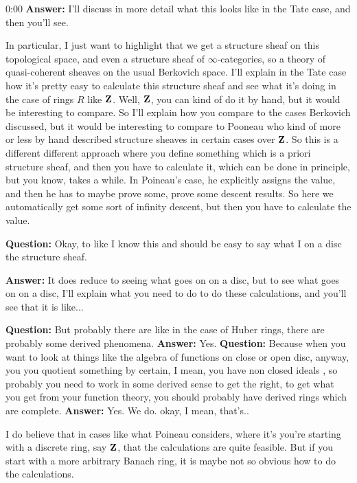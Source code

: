 \begin{unfinished}{0:00}
\textbf{Answer:} I'll discuss in more detail what this looks like in the Tate case, and then you'll see.

In particular, I just want to highlight that we get a structure sheaf on this topological space, and even a structure sheaf of $\infty$-categories, so a theory of quasi-coherent sheaves on the usual Berkovich space. 
I'll explain in the Tate case how it's pretty easy to calculate this structure sheaf and see what it's doing in the case of rings $R$ like $\mathbf Z$. Well, $\mathbf Z$, you can kind of do it by hand, but it would be interesting to compare. 
So I'll explain how you compare to the cases Berkovich discussed, but it would be interesting to compare to Pooneau \citeme{} who kind of more or less by hand described structure sheaves in certain cases over $\mathbf Z$. So this is a different different approach where you define something which is a priori structure sheaf, and then you have to calculate it, which can be done in principle, but you know, takes a while. In Poineau's case, he explicitly assigns the value, and then he has to maybe prove some, prove some descent results. So here we automatically get some sort of infinity descent, but then you have to calculate the value.

\textbf{Question:} Okay, to like I know this and should be easy to say what I on a disc the structure sheaf. 

\textbf{Answer:} It does reduce to seeing what goes on on a disc, but to see what goes on on a disc, I'll explain what you need to do to do these calculations, and you'll see that it is like...

\textbf{Question:} But probably there are like in the case of Huber rings, there are probably some derived phenomena.
\textbf{Answer:} Yes.
\textbf{Question:} Because when you want to look at things like the algebra of functions on close or open disc, anyway, you you quotient something by certain, I mean, you have non closed ideals , so probably you need to work in some derived sense to get the right, to get what you get from your function theory, you should probably have derived rings which are complete. 
\textbf{Answer:} Yes. We do. okay, I mean, that's..

I do believe that in cases like what Poineau considers, where it's you're starting with a discrete ring, say $\mathbf Z$, that the calculations are quite feasible.
But if you start with a more arbitrary Banach ring, it is maybe not so obvious how to do the calculations.


\end{unfinished}
